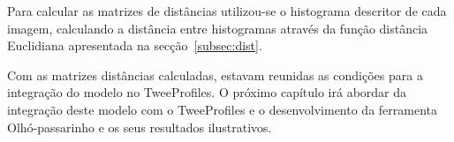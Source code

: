 Para calcular as matrizes de distâncias utilizou-se o histograma descritor de cada imagem, calculando a distância entre histogramas através da função distância Euclidiana apresentada na secção~\ref{subsec:dist}.

Com as matrizes distâncias calculadas, estavam reunidas as condições para a integração do modelo no TweeProfiles. O próximo capítulo irá abordar da integração deste modelo com o TweeProfiles e o desenvolvimento da ferramenta Olhó-passarinho e os seus resultados ilustrativos.